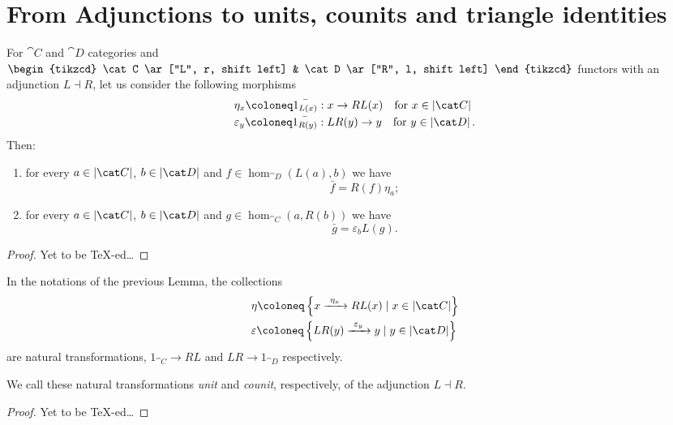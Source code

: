 
\section{From Adjunctions to units, counits and triangle identities}

\begin{lemma}
For \(\cat C\) and \(\cat D\) categories and \(\begin{tikzcd} \cat C \ar["L", r, shift left] & \cat D \ar["R", l, shift left] \end{tikzcd}\) functors with an adjunction \(L \dashv R\), let us consider the following morphisms
\begin{align*}
& \eta_x \coloneq \bar{1_{L(x)}} : x \to RL(x) \quad \text{for } x \in \obj{\cat C} \\
& \varepsilon_y \coloneq \bar{1_{R(y)}} : LR(y) \to y \quad \text{for } y \in \obj{\cat D} .
\end{align*}
Then:
\begin{enumerate}
\item for every \(a \in \obj{\cat C}\), \(b \in \obj{\cat D}\) and \(f \in \hom_{\cat D}(L(a), b)\) we have
\[\bar f = R(f) \eta_a ;\]
\item for every \(a \in \obj{\cat C}\), \(b \in \obj{\cat D}\) and \(g \in \hom_{\cat C}(a, R(b))\) we have
\[\bar g = \varepsilon_b L(g) .\]
\end{enumerate}
\end{lemma}

\begin{proof}
Yet to be \TeX{}-ed\dots{}
\end{proof}

\begin{proposition}
In the notations of the previous Lemma, the collections
\begin{align*}
& \eta \coloneq \set{x \functo{\eta_x} RL(x) \mid x \in \obj{\cat C}} \\
& \varepsilon \coloneq \set{LR(y) \functo{\varepsilon_y} y \mid y \in \obj{\cat D}}
\end{align*}
are natural transformations, \(1_{\cat C} \to RL\) and \(LR \to 1_{\cat D}\) respectively.
\end{proposition}

We call these natural transformations {\em unit} and {\em counit}, respectively, of the adjunction \(L \dashv R\). 

\begin{proof}
Yet to be \TeX{}-ed\dots{}
\end{proof}


